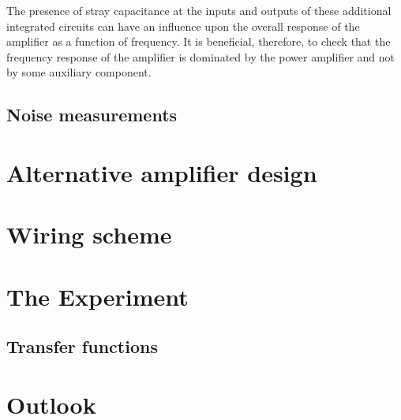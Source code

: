 The presence of stray capacitance at the inputs and outputs of these additional integrated circuits can have an influence upon the overall response of the amplifier as a function of frequency. It is beneficial, therefore, to check that the frequency response of the amplifier is dominated by the power amplifier and not by some auxiliary component.

\subsection{Noise measurements}


\section{\label{sec:hv-amplifier-alt}Alternative amplifier design}

\section{Wiring scheme}

\section{The Experiment}

\subsection{Transfer functions}

\section{Outlook}